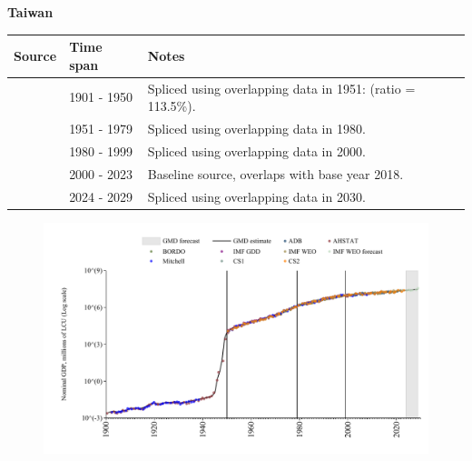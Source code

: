 \documentclass[12pt,a4paper,landscape]{article}
\begin{document}
\begin{adjustbox}{max totalsize={\paperwidth}{\paperheight},center}
\begin{minipage}[t][\textheight][t]{\textwidth}
\vspace*{0.5cm}
{}
\begin{center}
{\Large\bfseries Taiwan}
\end{center}
\vspace{0.5cm}
\begin{table}[H]
\centering
\small
\begin{tabular}{|l|l|l|}
\hline
\textbf{Source} & \textbf{Time span} & \textbf{Notes} \\
\hline
\rowcolor{white}\cite{AHSTAT}& 1901 - 1950 &Spliced using overlapping data in 1951: (ratio = 113.5\%).\\
\rowcolor{lightgray}\cite{IMF_GDD}& 1951 - 1979 &Spliced using overlapping data in 1980.\\
\rowcolor{white}\cite{IMF_WEO}& 1980 - 1999 &Spliced using overlapping data in 2000.\\
\rowcolor{lightgray}\cite{ADB}& 2000 - 2023 &Baseline source, overlaps with base year 2018.\\
\rowcolor{white}\cite{IMF_WEO_forecast}& 2024 - 2029 &Spliced using overlapping data in 2030.\\
\hline
\end{tabular}
\end{table}
\begin{figure}[H]
\centering
\includegraphics[width=\textwidth,height=0.6\textheight,keepaspectratio]{graphs/TWN_nGDP.pdf}
\end{figure}
\end{minipage}
\end{adjustbox}
\end{document}
